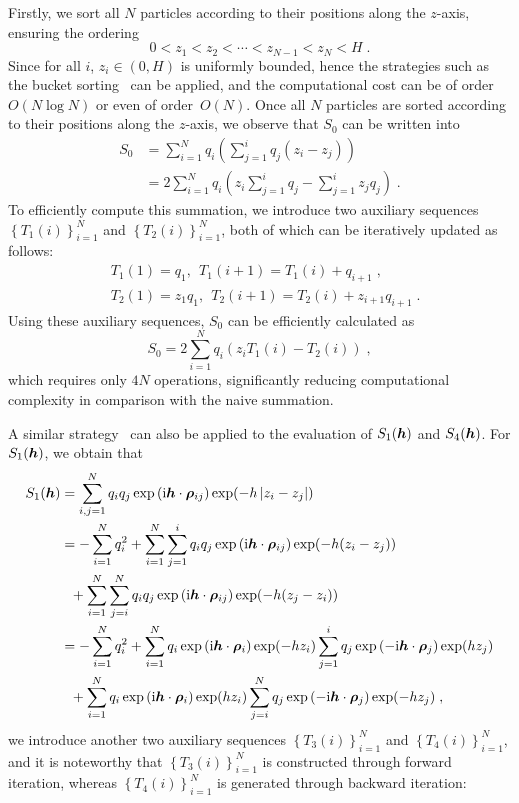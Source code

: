 Firstly, we sort all $N$ particles according to their positions along the 
$z$-axis, ensuring the ordering
\begin{equation*}
   0 < z_1 < z_2 <  \cdots <  z_{N - 1}<z_N < H\;.
\end{equation*}
Since for all  $i$, $z_i \in (0, H)$ is uniformly bounded, hence  the strategies such as the bucket sorting~\cite{corwin2004sorting} can be applied, and the computational cost can be of order~$O(N \log{N})$ or even  of order~$O(N)$. 
Once all $N$ particles are sorted according to their positions along the $z$-axis, we observe that $S_0$ can be written into
\begin{align*}
    S_0 
    & = \sum_{i = 1}^N q_i \left( \sum_{j = 1}^{i }{q_j (z_i - z_j)} \right) \\
    & = 2 \sum_{i = 1}^N q_i \left( z_i \sum_{j = 1}^{i }q_j - \sum_{j = 1}^{i }z_j q_j  \right) \;.
\end{align*}
To efficiently compute this summation, we introduce two auxiliary sequences  $\left\{T_1(i)\right\}_{i=1}^N$ and $\left\{T_2(i)\right\}_{i=1}^N$, both of which  can be iteratively updated as follows:
\begin{align*}
    &T_1(1)=q_1,~~T_1(i+1)=T_1(i)+q_{i+1}\;,\\
    &T_2(1)=z_1q_1,~~T_2(i+1)=T_2(i)+z_{i+1}q_{i+1}\;.
\end{align*}
Using these auxiliary sequences, 
$S_0$ can be efficiently calculated as
\[
S_0= 2 \sum_{i = 1}^N q_i \left( z_iT_1(i)-T_2(i)\right)\;,
\]
which requires only 
$4N$ operations, significantly reducing computational complexity in comparison with the naive summation.

A similar strategy~\cite{jiang2021approximating, gan2024fast} can also be applied to the evaluation of $S_1(\boldsymbol{h})$ and $S_4(\boldsymbol{h})$. For $S_1(\boldsymbol{h})$, we obtain that 
\begin{align*}
S_1(\boldsymbol{h})&=\sum_{i,j=1}^Nq_iq_j  \exp{(\mathrm{i} \boldsymbol{h} \cdot \boldsymbol{\rho}_{ij})}\exp(-h\left\lvert z_i-z_j\right\rvert)\\
&=-\sum_{i=1}^Nq_i^2+\sum_{i=1}^N \sum_{j=1}^iq_iq_j  \exp{(\mathrm{i} \boldsymbol{h} \cdot \boldsymbol{\rho}_{ij})}\exp(-h(z_i-z_j))\\
&~~+\sum_{i=1}^N \sum_{j=i}^Nq_iq_j  \exp{(\mathrm{i} \boldsymbol{h} \cdot \boldsymbol{\rho}_{ij})}\exp(-h(z_j-z_i))\\
&= -\sum_{i=1}^Nq_i^2+\sum_{i=1}^N q_i\exp{(\mathrm{i} \boldsymbol{h} \cdot \boldsymbol{\rho}_{i})}\exp(-hz_i)\sum_{j=1}^iq_j\exp{(-\mathrm{i} \boldsymbol{h} \cdot \boldsymbol{\rho}_{j})}\exp(hz_j)\\
&~~+\sum_{i=1}^N q_i\exp{(\mathrm{i} \boldsymbol{h} \cdot \boldsymbol{\rho}_{i})}\exp(hz_i)\sum_{j=i}^Nq_j\exp{(-\mathrm{i} \boldsymbol{h} \cdot \boldsymbol{\rho}_{j})}\exp(-hz_j)\;,
\end{align*}
 we introduce another two auxiliary sequences  $\left\{T_3(i)\right\}_{i=1}^N$ and $\left\{T_4(i)\right\}_{i=1}^N$, and it is noteworthy that $\left\{T_3(i)\right\}_{i=1}^N$ is  constructed through forward iteration, whereas  $\left\{T_4(i)\right\}_{i=1}^N$   is generated through backward iteration:

